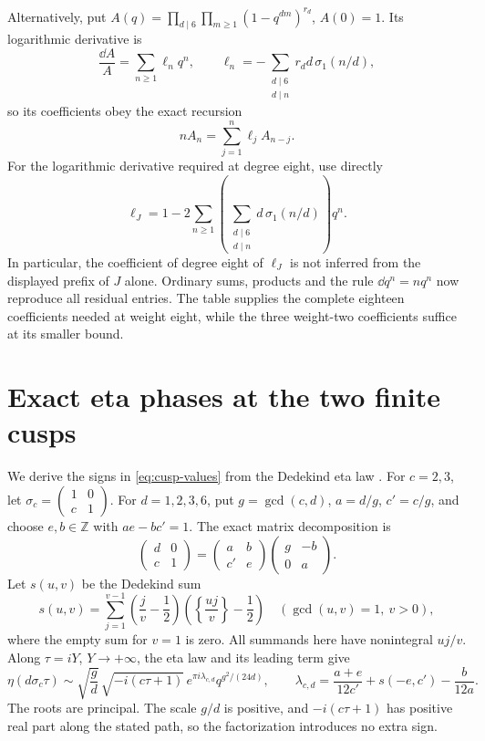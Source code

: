 \documentclass[11pt,a4paper]{article}
\theoremstyle{remark}
\newcommand{\Z}{\mathbb Z}\newcommand{\Q}{\mathbb Q}
\newcommand{\smat}[4]{\begin{pmatrix}#1&#2\\#3&#4\end{pmatrix}}
\begin{document}
Alternatively, put $A(q)=\prod_{d\mid6}\prod_{m\ge1}(1-q^{dm})^{r_d}$,
$A(0)=1$. Its logarithmic derivative is
\[
 \frac{\dd A}{A}=\sum_{n\ge1}\ell_nq^n,
 \qquad
 \ell_n=-\sum_{\substack{d\mid6\\d\mid n}}
              r_d d\,\sigma_1(n/d),
\]
so its coefficients obey the exact recursion
\begin{equation}\label{eq:eta-recurrence-algorithm}
 n A_n=\sum_{j=1}^n\ell_j A_{n-j}.
\end{equation}
For the logarithmic derivative required at degree eight, use directly
\begin{equation}\label{eq:ell-J}
 \ell_J=1-2\sum_{n\ge1}
   \left(\sum_{\substack{d\mid6\\d\mid n}}d\,\sigma_1(n/d)\right)q^n.
\end{equation}
In particular, the coefficient of degree eight of $\ell_J$ is not
inferred from the displayed prefix of $J$ alone.
Ordinary sums, products and the rule $\dd q^n=nq^n$ now reproduce
all residual entries. The table supplies the complete eighteen
coefficients needed at weight eight, while the three weight-two
coefficients suffice at its smaller bound.

\section{Exact eta phases at the two finite cusps}\label{app:cusps}
We derive the signs in \eqref{eq:cusp-values} from the Dedekind
eta law \cite[23.18.5--23.18.7]{dlmf}.
For $c=2,3$, let $\sigma_c=\smat10c1$.
For $d=1,2,3,6$, put $g=\gcd(c,d)$, $a=d/g$, $c'=c/g$,
and choose $e,b\in\Z$ with $ae-bc'=1$.
The exact matrix decomposition is
\begin{equation}\label{eq:cusp-factorization}
 \begin{pmatrix}d&0\\c&1\end{pmatrix}
 =\begin{pmatrix}a&b\\c'&e\end{pmatrix}
  \begin{pmatrix}g&-b\\0&a\end{pmatrix}.
\end{equation}
Let $s(u,v)$ be the Dedekind sum
\[
 s(u,v)=\sum_{j=1}^{v-1}
  \left(\frac jv-\frac12\right)
  \left(\left\{\frac{uj}{v}\right\}-\frac12\right)
 \quad(\gcd(u,v)=1,\ v>0),
\]
where the empty sum for $v=1$ is zero.
All summands here have nonintegral $uj/v$.
Along $\tau=iY$, $Y\to+\infty$, the eta law and its leading term give
\begin{equation}\label{eq:cusp-eta-asymptotic}
 \eta(d\sigma_c\tau)\sim
 \sqrt{\frac gd}\,\sqrt{-i(c\tau+1)}\,
 e^{\pi i\lambda_{c,d}}q^{g^2/(24d)},\qquad
 \lambda_{c,d}=\frac{a+e}{12c'}+s(-e,c')-\frac{b}{12a}.
\end{equation}
The roots are principal. The scale $g/d$ is positive, and
$-i(c\tau+1)$ has positive real part along the stated path,
so the factorization introduces no extra sign.
\end{document}
